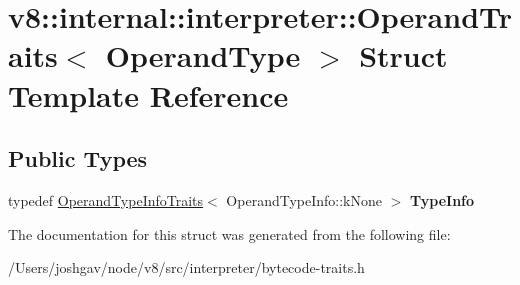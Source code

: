 \hypertarget{structv8_1_1internal_1_1interpreter_1_1_operand_traits}{}\section{v8\+:\+:internal\+:\+:interpreter\+:\+:Operand\+Traits$<$ Operand\+Type $>$ Struct Template Reference}
\label{structv8_1_1internal_1_1interpreter_1_1_operand_traits}
\subsection*{Public Types}
\begin{DoxyCompactItemize}
\item 
typedef \hyperlink{structv8_1_1internal_1_1interpreter_1_1_operand_type_info_traits}{Operand\+Type\+Info\+Traits}$<$ Operand\+Type\+Info\+::k\+None $>$ {\bfseries Type\+Info}\hypertarget{structv8_1_1internal_1_1interpreter_1_1_operand_traits_af273989077b718a9bd9ec1abe2329d82}{}\label{structv8_1_1internal_1_1interpreter_1_1_operand_traits_af273989077b718a9bd9ec1abe2329d82}

\end{DoxyCompactItemize}


The documentation for this struct was generated from the following file\+:\begin{DoxyCompactItemize}
\item 
/\+Users/joshgav/node/v8/src/interpreter/bytecode-\/traits.\+h\end{DoxyCompactItemize}
